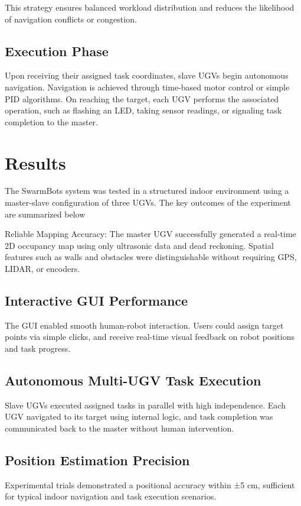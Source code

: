 \documentclass[conference]{IEEEtran}
\begin{document}
This strategy ensures balanced workload distribution and reduces the likelihood of navigation conflicts or congestion.

\subsection{Execution Phase}
Upon receiving their assigned task coordinates, slave UGVs begin autonomous navigation. Navigation is achieved through time-based motor control or simple PID algorithms. On reaching the target, each UGV performs the associated operation, such as flashing an LED, taking sensor readings, or signaling task completion to the master.

\section{Results}
\label{sec:results}
The SwarmBots system was tested in a structured indoor environment using a master-slave configuration of three UGVs. The key outcomes of the experiment are summarized below

Reliable Mapping Accuracy: The master UGV successfully generated a real-time 2D occupancy map using only ultrasonic data and dead reckoning. Spatial features such as walls and obstacles were distinguishable without requiring GPS, LIDAR, or encoders.

\subsection{Interactive GUI Performance} 
The GUI enabled smooth human-robot interaction. Users could assign target points via simple clicks, and receive real-time visual feedback on robot positions and task progress.

\subsection{Autonomous Multi-UGV Task Execution}
Slave UGVs executed assigned tasks in parallel with high independence. Each UGV navigated to its target using internal logic, and task completion was communicated back to the master without human intervention.

\subsection{Position Estimation Precision}
Experimental trials demonstrated a positional accuracy within ±5 cm, sufficient for typical indoor navigation and task execution scenarios.
\end{document}
